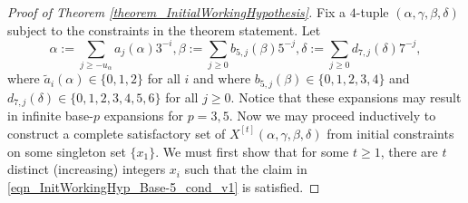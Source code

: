 \documentclass[12pt]{article}
\begin{document}
\begin{proof}[Proof of Theorem \ref{theorem_InitialWorkingHypothesis}]
Fix a $4$-tuple $(\alpha,\gamma,\beta,\delta)$ subject to the constraints in the theorem statement. 
Let 
\[
\alpha := \sum_{j \geq -u_{\alpha}} a_j(\alpha) 3^{-i}, 
\beta := \sum_{j \geq 0} b_{5,j}(\beta) 5^{-j}, 
\delta := \sum_{j \geq 0} d_{7,j}(\delta) 7^{-j}, 
\] 
where $\widetilde{a}_i(\alpha) \in \{0,1,2\}$ for all $i$ and where 
$b_{5,j}(\beta) \in \{0,1,2,3,4\}$ and $d_{7,j}(\delta) \in \{0,1,2,3,4,5,6\}$ for all $j \geq 0$. 
Notice that these expansions may result in infinite 
base-$p$ expansions for $p=3,5$. Now we may proceed inductively to construct a complete satisfactory set 
of $X^{[t]}(\alpha,\gamma,\beta,\delta)$ from initial constraints on some singleton set $\{x_1\}$. 
We must first show that for some $t \geq 1$, there are $t$ distinct (increasing) integers $x_i$ such that the 
claim in \eqref{eqn_InitWorkingHyp_Base-5_cond_v1} is satisfied. 


\end{proof}
\end{document}

